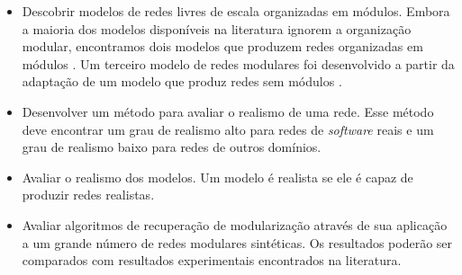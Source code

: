 \documentclass[12pt]{article}
\begin{document}
\begin{itemize}

\item Descobrir modelos de redes livres de escala organizadas em
módulos. Embora a maioria dos modelos disponíveis na literatura ignorem a
organização modular, encontramos dois modelos que produzem redes organizadas em
módulos \cite{Chen2008,Lancichinetti2009}. Um terceiro modelo de redes modulares
foi desenvolvido a partir da adaptação de um modelo que produz redes sem módulos
\cite{Bollobas2003}.


\item Desenvolver um método para avaliar o realismo de uma rede. Esse método
deve encontrar um grau de realismo alto para redes de \emph{software} reais e um
grau de realismo baixo para redes de outros domínios. %

\item Avaliar o realismo dos modelos. Um modelo é realista se ele é
capaz de produzir redes realistas.

\item Avaliar algoritmos de recuperação de modularização através de sua
aplicação a um grande número de redes modulares sintéticas. Os resultados
poderão ser comparados com resultados experimentais encontrados na literatura.

\end{itemize}




\end{document}
